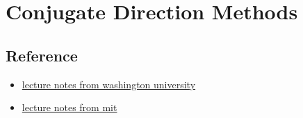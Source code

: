 \chapter{Conjugate Direction Methods}\label{chp:Conjugate_direction}





\section{Reference}
\begin{itemize}
    \item \href{https://sites.math.washington.edu//~burke/crs/408/notes/nlp/cg.pdf}{lecture notes from washington university}
    \item \href{https://ocw.mit.edu/courses/15-084j-nonlinear-programming-spring-2004/resources/lec4_quad_form/}{lecture notes from mit}
\end{itemize}